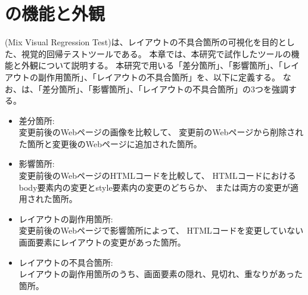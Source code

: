 \chapter{ \toolName の機能と外観}\label{cha:Function}
\toolName (Mix Visual Regression Test)は、レイアウトの不具合箇所の可視化を目的とした、視覚的回帰テストツールである。
本章では、本研究で試作したツール\toolName の機能と外観について説明する。
本研究で用いる「差分箇所」、「影響箇所」、「レイアウトの副作用箇所」、「レイアウトの不具合箇所」を、以下に定義する。
なお、\toolName は、「差分箇所」、「影響箇所」、「レイアウトの不具合箇所」の3つを強調する。
\begin{itemize}
    \item 差分箇所:\\
          変更前後のWebページの画像を比較して、
          変更前のWebページから削除された箇所と変更後のWebページに追加された箇所。
    \item 影響箇所:\\
          変更前後のWebページのHTMLコードを比較して、
          HTMLコードにおけるbody要素内の変更とstyle要素内の変更のどちらか、
          または両方の変更が適用された箇所。
    \item レイアウトの副作用箇所:\\
          変更前後のWebページで影響箇所によって、
          HTMLコードを変更していない画面要素にレイアウトの変更があった箇所。
    \item レイアウトの不具合箇所:\\
          レイアウトの副作用箇所のうち、画面要素の隠れ、見切れ、重なりがあった箇所。
\end{itemize}

